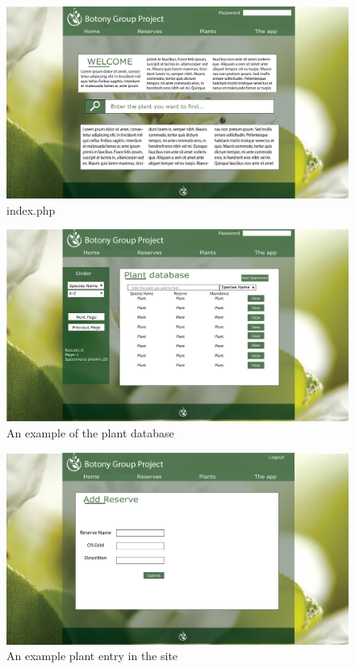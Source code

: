         \begin{landscape}
            \begin{figure}
                \centering
                \includegraphics[scale=0.4]{uiDesign/uiwebimages/index.png}
                \caption{index.php}
                \label{fig:indexWebpage}
            \end{figure}

            \begin{figure}
                \centering
                \includegraphics[scale=0.4]{uiDesign/uiwebimages/plantdb.png}
                \caption{An example of the plant database}
                \label{fig:plantDbWeb}
            \end{figure}

            \begin{figure}
                \centering
                \includegraphics[scale=0.4]{uiDesign/uiwebimages/addreserve.png}
                \caption{An example plant entry in the site}
                \label{fig:viewWeb}
            \end{figure}


\end{landscape}
